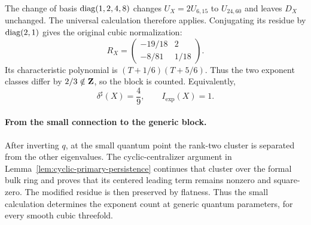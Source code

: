 The change of basis \(\operatorname{diag}(1,2,4,8)\) changes \(U_X=2U_{6,15}\)
to \(U_{24,60}\) and leaves \(D_X\) unchanged.  The universal calculation
therefore applies.  Conjugating its residue by \(\operatorname{diag}(2,1)\)
gives the original cubic normalization:
\begin{equation}
 R_X
 =\begin{pmatrix}-19/18&2\\-8/81&1/18\end{pmatrix}.
 \label{eq:RX}
\end{equation}
Its characteristic polynomial is
\((T+1/6)(T+5/6)\).  Thus the two exponent classes differ by
\(2/3\notin\mathbf Z\), so the block is counted.  Equivalently,
\begin{equation}
 \boxed{\delta^\sharp(X)=\frac49},
 \qquad I_{\mathrm{exp}}(X)=1.
 \label{eq:cubic-delta}
\end{equation}

\paragraph{From the small connection to the generic block.}
After inverting \(q\), at the small quantum point the rank-two cluster is separated from the
other eigenvalues.  The cyclic-centralizer argument in
Lemma~\ref{lem:cyclic-primary-persistence} continues that cluster over the formal
bulk ring and proves that its centered leading term remains nonzero and
square-zero.  The modified residue is then preserved by flatness.  Thus
the small calculation determines the exponent count at generic quantum
parameters, for every smooth cubic threefold.

